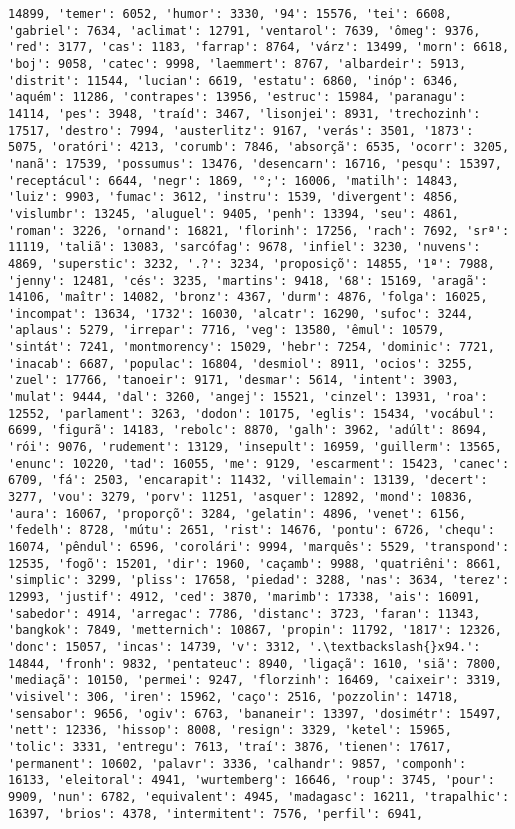 \begin{Verbatim}[commandchars=\\\{\}]
14899, 'temer': 6052, 'humor': 3330, '94': 15576, 'tei': 6608, 'gabriel': 7634, 'aclimat': 12791, 'ventarol': 7639, 'ômeg': 9376, 'red': 3177, 'cas': 1183, 'farrap': 8764, 'várz': 13499, 'morn': 6618, 'boj': 9058, 'catec': 9998, 'laemmert': 8767, 'albardeir': 5913, 'distrit': 11544, 'lucian': 6619, 'estatu': 6860, 'inóp': 6346, 'aquém': 11286, 'contrapes': 13956, 'estruc': 15984, 'paranagu': 14114, 'pes': 3948, 'traíd': 3467, 'lisonjei': 8931, 'trechozinh': 17517, 'destro': 7994, 'austerlitz': 9167, 'verás': 3501, '1873': 5075, 'oratóri': 4213, 'corumb': 7846, 'absorçã': 6535, 'ocorr': 3205, 'nanã': 17539, 'possumus': 13476, 'desencarn': 16716, 'pesqu': 15397, 'receptácul': 6644, 'negr': 1869, '°;': 16006, 'matilh': 14843, 'luiz': 9903, 'fumac': 3612, 'instru': 1539, 'divergent': 4856, 'vislumbr': 13245, 'aluguel': 9405, 'penh': 13394, 'seu': 4861, 'roman': 3226, 'ornand': 16821, 'florinh': 17256, 'rach': 7692, 'srª': 11119, 'taliã': 13083, 'sarcófag': 9678, 'infiel': 3230, 'nuvens': 4869, 'superstic': 3232, '.?': 3234, 'proposiçõ': 14855, '1ª': 7988, 'jenny': 12481, 'cés': 3235, 'martins': 9418, '68': 15169, 'aragã': 14106, 'maîtr': 14082, 'bronz': 4367, 'durm': 4876, 'folga': 16025, 'incompat': 13634, '1732': 16030, 'alcatr': 16290, 'sufoc': 3244, 'aplaus': 5279, 'irrepar': 7716, 'veg': 13580, 'êmul': 10579, 'sintát': 7241, 'montmorency': 15029, 'hebr': 7254, 'dominic': 7721, 'inacab': 6687, 'populac': 16804, 'desmiol': 8911, 'ocios': 3255, 'zuel': 17766, 'tanoeir': 9171, 'desmar': 5614, 'intent': 3903, 'mulat': 9444, 'dal': 3260, 'angej': 15521, 'cinzel': 13931, 'roa': 12552, 'parlament': 3263, 'dodon': 10175, 'eglis': 15434, 'vocábul': 6699, 'figurã': 14183, 'rebolc': 8870, 'galh': 3962, 'adúlt': 8694, 'rói': 9076, 'rudement': 13129, 'insepult': 16959, 'guillerm': 13565, 'enunc': 10220, 'tad': 16055, 'me': 9129, 'escarment': 15423, 'canec': 6709, 'fá': 2503, 'encarapit': 11432, 'villemain': 13139, 'decert': 3277, 'vou': 3279, 'porv': 11251, 'asquer': 12892, 'mond': 10836, 'aura': 16067, 'proporçõ': 3284, 'gelatin': 4896, 'venet': 6156, 'fedelh': 8728, 'mútu': 2651, 'rist': 14676, 'pontu': 6726, 'chequ': 16074, 'pêndul': 6596, 'corolári': 9994, 'marquês': 5529, 'transpond': 12535, 'fogõ': 15201, 'dir': 1960, 'caçamb': 9988, 'quatriêni': 8661, 'simplic': 3299, 'pliss': 17658, 'piedad': 3288, 'nas': 3634, 'terez': 12993, 'justif': 4912, 'ced': 3870, 'marimb': 17338, 'ais': 16091, 'sabedor': 4914, 'arregac': 7786, 'distanc': 3723, 'faran': 11343, 'bangkok': 7849, 'metternich': 10867, 'propin': 11792, '1817': 12326, 'donc': 15057, 'incas': 14739, 'v': 3312, '.\textbackslash{}x94.': 14844, 'fronh': 9832, 'pentateuc': 8940, 'ligaçã': 1610, 'siã': 7800, 'mediaçã': 10150, 'permei': 9247, 'florzinh': 16469, 'caixeir': 3319, 'visivel': 306, 'iren': 15962, 'caço': 2516, 'pozzolin': 14718, 'sensabor': 9656, 'ogiv': 6763, 'bananeir': 13397, 'dosimétr': 15497, 'nett': 12336, 'hissop': 8008, 'resign': 3329, 'ketel': 15965, 'tolic': 3331, 'entregu': 7613, 'traí': 3876, 'tienen': 17617, 'permanent': 10602, 'palavr': 3336, 'calhandr': 9857, 'componh': 16133, 'eleitoral': 4941, 'wurtemberg': 16646, 'roup': 3745, 'pour': 9909, 'nun': 6782, 'equivalent': 4945, 'madagasc': 16211, 'trapalhic': 16397, 'brios': 4378, 'intermitent': 7576, 'perfil': 6941, 
\end{Verbatim}
